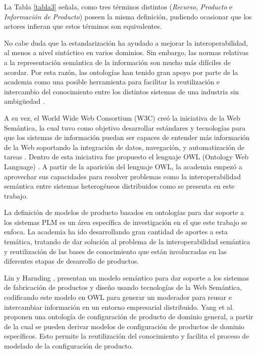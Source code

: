 \documentclass[journal]{IEEEtran}
\begin{document}
La Tabla \ref{tabla3} se\~nala, como tres t\'erminos distintos (\emph{Recurso}, \emph{Producto} e \emph{Informaci\'on de Producto}) poseen la misma definici\'on, pudiendo ocasionar que los actores infieran que estos t\'erminos son equivalentes.

No cabe duda que la estandarizaci\'on ha ayudado a mejorar la interoperabilidad, al menos a nivel sint\'actico en varios dominios. Sin embargo, las normas relativas a la representaci\'on sem\'antica de la informaci\'on son mucho m\'as dif\'iciles de acordar. Por esta raz\'on, las ontolog\'ias han tenido gran apoyo por parte de la academia como una posible herramienta para facilitar la reutilizaci\'on e intercambio del conocimiento entre los distintos sistemas de una industria sin ambig\"{u}edad \cite{CuongPhamCongandDurupt2015KnowledgeManagement}.

A su vez, el World Wide Web Consortium (W3C) cre\'o la iniciativa de la Web Sem\'antica, la cual tuvo como objetivo desarrollar est\'andares y tecnolog\'ias para que los sistemas de informaci\'on puedan ser capaces de entender m\'as informaci\'on de la Web soportando la integraci\'on de datos, navegaci\'on, y automatizaci\'on de tareas \cite{koivunen2001w3c}. Dentro de esta iniciativa fue propuesto el lenguaje OWL (Ontology Web Language) \cite{mcguinness2004owl}. A partir de la aparici\'on del lenguaje OWL, la academia empez\'o a aprovechar sus capacidades para resolver problemas como la interoperabilidad sem\'antica entre sistemas heterog\'eneos distribuidos como se presenta en este trabajo.

La definici\'on de modelos de producto basados en ontolog\'ias para dar soporte a los sistemas PLM es un \'area espec\'ifica de investigaci\'on en el que este trabajo se enfoca. La academia ha ido desarrollando gran cantidad de aportes a esta tem\'atica, tratando de dar soluci\'on al problema de la interoperabilidad sem\'antica y reutilizaci\'on de las bases de conocimiento que est\'an involucradas en las diferentes etapas de desarrollo de productos.

Lin y Harnding \cite{Lin2007}, presentan un modelo sem\'antico para dar soporte a los sistemas de fabricaci\'on de productos y dise\~no usando tecnolog\'ias de la Web Sem\'antica, codificando este modelo en OWL para generar un moderador para reusar e intercambiar informaci\'on en un entorno empresarial distribuido.
Yang et al. \cite{Yang2009} proponen una ontolog\'ia de configuraci\'on de producto de dominio general, a partir de la cual se pueden derivar modelos de configuraci\'on de productos de dominio espec\'ificos. Esto permite la reutilizaci\'on del conocimiento y facilita el proceso de modelado de la configuraci\'on de producto. 
\end{document}
